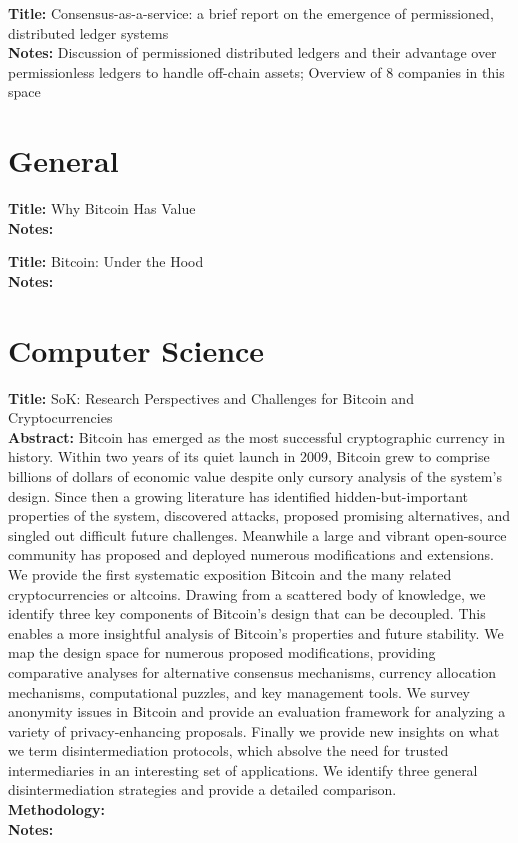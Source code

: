 \documentclass[a4paper, 12pt]{scrartcl}
\begin{document}
\textbf{Title:} Consensus-as-a-service: a brief report on the emergence of permissioned, distributed ledger systems \parencite{swansonconsensus} \\
\textbf{Notes:} Discussion of permissioned distributed ledgers and their advantage over permissionless ledgers to handle off-chain assets; Overview of 8 companies in this space

\section{General}

\textbf{Title:} Why Bitcoin Has Value \parencite{VanAlstyne:2014:WBV:2594413.2594288} \\
\textbf{Notes:}

\textbf{Title:} Bitcoin: Under the Hood \parencite{Zohar:2015:BUH:2817191.2701411} \\
\textbf{Notes:} 

\section{Computer Science}

\textbf{Title:} SoK: Research Perspectives and Challenges for Bitcoin and Cryptocurrencies \parencite{bonneau2015sok} \\
\textbf{Abstract:} Bitcoin has emerged as the most successful cryptographic
currency in history. Within two years of its quiet launch
in 2009, Bitcoin grew to comprise billions of dollars of economic
value despite only cursory analysis of the system’s design. Since
then a growing literature has identified hidden-but-important
properties of the system, discovered attacks, proposed promising
alternatives, and singled out difficult future challenges.
Meanwhile a large and vibrant open-source community has
proposed and deployed numerous modifications and extensions.
We provide the first systematic exposition Bitcoin and the
many related cryptocurrencies or altcoins. Drawing from a
scattered body of knowledge, we identify three key components
of Bitcoin’s design that can be decoupled. This enables a more
insightful analysis of Bitcoin’s properties and future stability.
We map the design space for numerous proposed modifications,
providing comparative analyses for alternative consensus
mechanisms, currency allocation mechanisms, computational
puzzles, and key management tools. We survey anonymity
issues in Bitcoin and provide an evaluation framework for
analyzing a variety of privacy-enhancing proposals. Finally
we provide new insights on what we term disintermediation
protocols, which absolve the need for trusted intermediaries
in an interesting set of applications. We identify three general
disintermediation strategies and provide a detailed comparison.\\
\textbf{Methodology:} \\
\textbf{Notes:}
\end{document}
